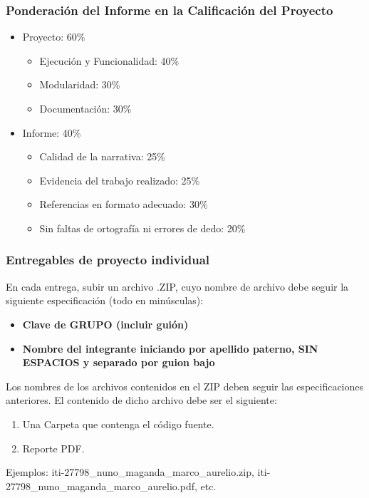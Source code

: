 \documentclass[aspectratio=169]{beamer}
\begin{document}
\begin{frame}
\frametitle{Ponderación del Informe en la Calificación del Proyecto}
\begin{itemize}
\item Proyecto: 60\%
\begin{itemize}
\item Ejecución y Funcionalidad: 40\%
\item Modularidad: 30\%
\item Documentación: 30\%
\end{itemize}
\item Informe: 40\%
\begin{itemize}
\item Calidad de la narrativa: 25\%
\item Evidencia del trabajo realizado: 25\%
\item Referencias en formato adecuado: 30\%
\item Sin faltas de ortografía ni errores de dedo: 20\%
\end{itemize}

\end{itemize}

\end{frame}



\begin{frame}
\frametitle{Entregables de proyecto individual}
En cada entrega, subir un archivo .ZIP, cuyo nombre de archivo debe seguir la siguiente especificación (todo en minúsculas):
\begin{itemize}
\item \textbf{Clave de GRUPO (incluir guión)}
\item \textbf{Nombre del integrante iniciando por apellido paterno, SIN ESPACIOS y separado por guion bajo}
\end{itemize}
Los nombres de los archivos contenidos en el ZIP deben seguir las especificaciones anteriores. El contenido de dicho archivo debe ser el siguiente:
\begin{enumerate}
\item Una Carpeta que contenga el código fuente. 
\item Reporte PDF. 
\end{enumerate}
Ejemplos: 
iti-27798\_nuno\_maganda\_marco\_aurelio.zip,  iti-27798\_nuno\_maganda\_marco\_aurelio.pdf, etc. 
\end{frame}
\end{document}
